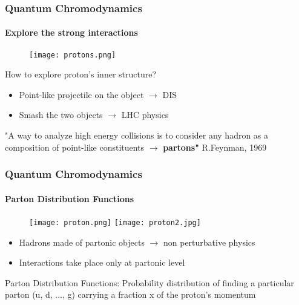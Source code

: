\documentclass[aspectratio=43]{beamer}
\begin{document}
\begin{frame}

	\frametitle{Quantum Chromodynamics}
	\framesubtitle{Explore the strong interactions}
	
	\begin{figure}
		\texttt{[image: protons.png]}
	\end{figure}
	
	How to explore proton's inner structure?
	
	\begin{itemize}
		\item Point-like projectile on the object $\longrightarrow$ DIS
		\item Smash the two objects $\longrightarrow$ LHC physics
	\end{itemize}
	
	{\color{blue}"A way to analyze high energy collisions is to consider any hadron as a composition of point-like constituents $\longrightarrow$ \textbf{partons"} } R.Feynman, 1969 

\end{frame}

\begin{frame}

	\frametitle{Quantum Chromodynamics}
	\framesubtitle{Parton Distribution Functions}
	
	\begin{figure}
		\texttt{[image: proton.png]}
		\endminipage\hfill
		\texttt{[image: proton2.jpg]}
		\endminipage
	\end{figure}
	

	\begin{itemize}
		\item Hadrons made of partonic objects $\longrightarrow$ non perturbative physics
		\item Interactions take place only at partonic level
	\end{itemize}

	{\color{blue}Parton Distribution Functions: Probability distribution of finding a particular parton (u, d, ..., g) carrying a fraction x of the proton's momentum}

\end{frame}
\end{document}
